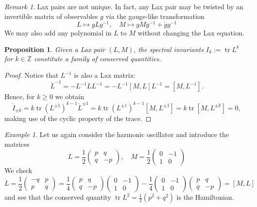 \documentclass[11pt]{report}
\newtheorem{prop}[theorem]{Proposition}
\theoremstyle{definition}
\theoremstyle{remark}
\newtheorem*{remark}{Remark}
\theoremstyle{remark}
\newtheorem*{example}{Example}
\newcommand{\Z}{\mathbb{Z}}
\begin{document}
\begin{remark}
Lax pairs are not unique. In fact, any Lax pair may be twisted by an invertible matrix of observables $g$ via the gauge-like transformation
\begin{equation*}
L \mapsto gLg^{-1}, \quad M \mapsto gMg^{-1} + \dot g g^{-1}
\end{equation*}
We may also add any polynomial in $L$ to $M$ without changing the Lax equation.
\end{remark}

\begin{prop}
Given a Lax pair $(L,M)$, the spectral invariants $I_k := \operatorname{tr} L^k$ for $k \in \Z$ constitute a family of conserved quantities.
\end{prop}

\begin{proof}
Notice that $L^{-1}$ is also a Lax matrix:
\begin{equation*}
\dot L^{-1} = - L^{-1} \dot L L^{-1} = -L^{-1} [M,L] L^{-1} = [M,L^{-1}].
\end{equation*}
Hence, for $k \geq 0$ we obtain
\begin{equation*}
\dot I_{\pm k} = k \operatorname{tr} (L^{\pm 1})^{k-1} \dot L^{\pm 1} = k \operatorname{tr} (L^{\pm 1})^{k-1} [M,L^{\pm 1}] = k \operatorname{tr} [M,L^{\pm k}] = 0,
\end{equation*}
making use of the cyclic property of the trace.
\end{proof}

\begin{example}
Let us again consider the harmonic oscillator and introduce the matrices
\begin{equation*}
L = \frac{1}{2}
\begin{pmatrix}
p & q \\ q & -p
\end{pmatrix},
\quad
M = \frac{1}{2}
\begin{pmatrix}
0 & -1 \\
1 & 0
\end{pmatrix}
\end{equation*}
We check
\begin{equation*}
\dot L = \frac{1}{2}
\begin{pmatrix}
-q & p \\ p & q
\end{pmatrix}
=
\frac{1}{4}
\begin{pmatrix}
p & q \\ q & -p
\end{pmatrix}
\begin{pmatrix}
0 & -1 \\
1 & 0
\end{pmatrix}
-
\frac{1}{4}
\begin{pmatrix}
0 & -1 \\
1 & 0
\end{pmatrix}
\begin{pmatrix}
p & q \\ q & -p
\end{pmatrix}
= [M,L]
\end{equation*}
and see that the conserved quantity $\operatorname{tr} L^2 = \frac{1}{2}(p^2+q^2)$ is the Hamiltonian.
\end{example}
\end{document}
